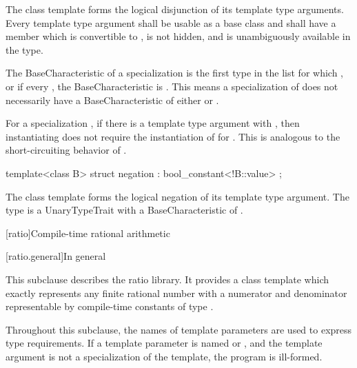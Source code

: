 \begin{itemdescr}
\pnum
The class template 
forms the logical disjunction of its template type arguments.
Every template type argument shall be usable as a base class and
shall have a member  which
is convertible to ,
is not hidden, and
is unambiguously available in the type.

\pnum
The BaseCharacteristic of a specialization 
is the first type  in the list 
for which , or
if every , the BaseCharacteristic is .
\enternote This means a specialization of 
does not necessarily have a BaseCharacteristic
of either  or .
\exitnote

\pnum
For a specialization ,
if there is a template type argument  with ,
then instantiating 
does not require the instantiation of  for .
\enternote This is analogous to the short-circuiting behavior of \tcode{||}.
\exitnote
\end{itemdescr}

%
\begin{itemdecl}
template<class B> struct negation : bool_constant<!B::value> { };
\end{itemdecl}

\begin{itemdescr}
\pnum
The class template 
forms the logical negation of its template type argument.
The type 
is a UnaryTypeTrait with a BaseCharacteristic of .
\end{itemdescr}

[ratio]{Compile-time rational arithmetic}

[ratio.general]{In general}

\pnum
{}%
This subclause describes the ratio library. It provides a class template
 which exactly represents any finite rational number with a
numerator and denominator representable by compile-time constants of type
.

\pnum
Throughout this subclause, the names of template parameters are used to express
type requirements. If a template parameter is named  or ,
and the template argument is not a specialization of the  template,
the program is ill-formed.

